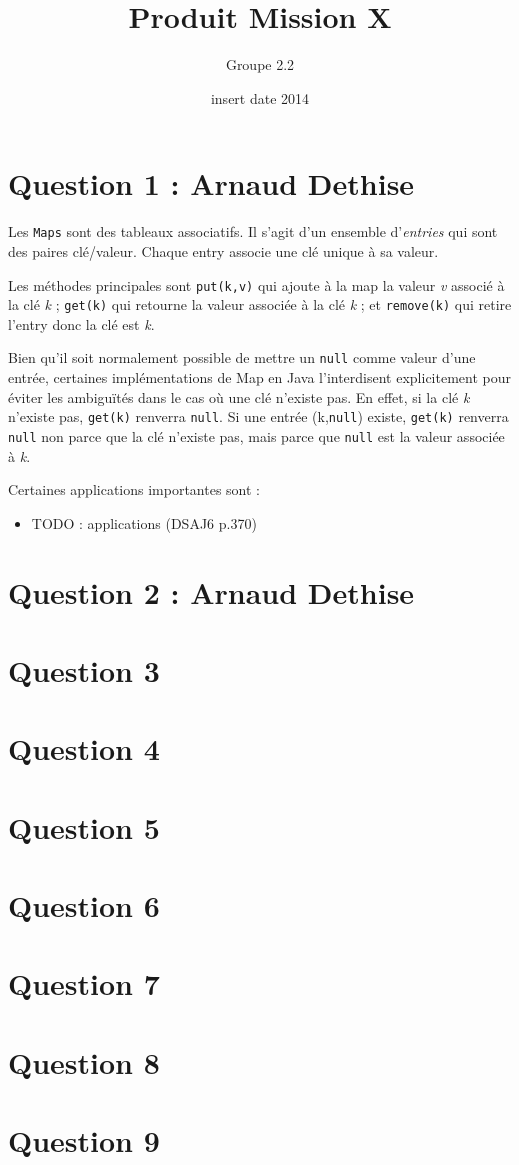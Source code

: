 \documentclass[10pt,a4paper]{article}
\date{insert date 2014}
\author{Groupe 2.2}
\title{Produit Mission X}
\begin{document}
\maketitle

\section*{Question 1 : Arnaud Dethise}

	Les \texttt{Maps} sont des tableaux associatifs. Il s'agit d'un ensemble d'\textit{entries} qui sont des paires clé/valeur. Chaque entry associe une clé unique à sa valeur.

	Les méthodes principales sont \texttt{put(k,v)} qui ajoute à la map la valeur \textit{v} associé à la clé \textit{k} ; \texttt{get(k)} qui retourne la valeur associée à la clé \textit{k} ; et \texttt{remove(k)} qui retire l'entry donc la clé est \textit{k}.
	
	\vspace{0.35cm}

	Bien qu'il soit normalement possible de mettre un \texttt{null} comme valeur d'une entrée, certaines implémentations de Map en Java l'interdisent explicitement pour éviter les ambiguïtés dans le cas où une clé n'existe pas. En effet, si la clé \textit{k} n'existe pas, \texttt{get(k)} renverra \texttt{null}. Si une entrée (k,\texttt{null}) existe, \texttt{get(k)} renverra \texttt{null} non parce que la clé n'existe pas, mais parce que \texttt{null} est la valeur associée à \textit{k}.
	
	\vspace{0.35cm}
	
	Certaines applications importantes sont :
	\begin{itemize}
		\item TODO : applications (DSAJ6 p.370)	
	\end{itemize}

\section*{Question 2 : Arnaud Dethise}
\section*{Question 3}
\section*{Question 4}
\section*{Question 5}
\section*{Question 6}
\section*{Question 7}
\section*{Question 8}
\section*{Question 9}
\end{document}
